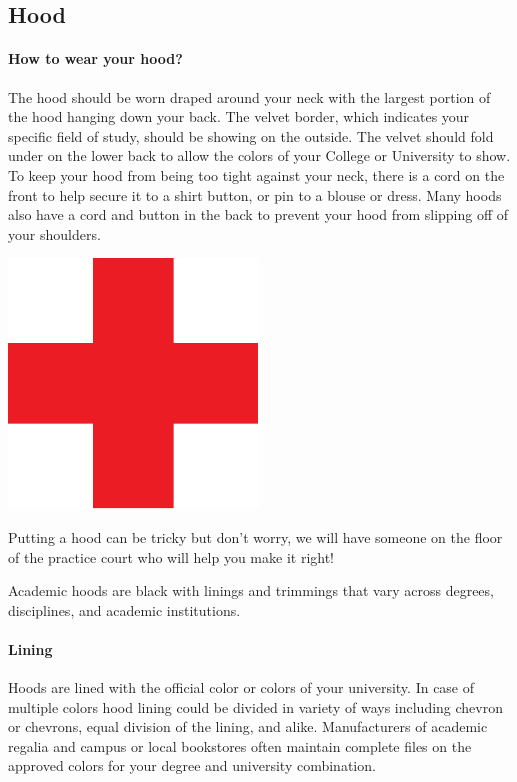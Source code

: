 \documentclass{tufte-handout}
\begin{document}
\subsection{Hood}
\paragraph{How to wear your hood?}The hood should be worn draped around your neck with the largest portion of the hood hanging down your back. The velvet border, which indicates your specific field of study, should be showing on the outside. The velvet should fold under on the lower back to allow the colors of your College or University to show. To keep your hood from being too tight against your neck, there is a cord on the front to help secure it to a shirt button, or pin to a blouse or dress. Many hoods also have a cord and button in the back to prevent your hood from slipping off of your shoulders.

\begin{marginfigure}[-12\baselineskip]%
  \includegraphics[width=.5\linewidth]{red-cross}
  \caption{\linespread{1.3}\selectfont{}Putting a hood can be tricky but don't worry, we will have someone on the floor of the practice court who will help you make it right!}
  \label{fig:help}
\end{marginfigure}

Academic hoods are black with linings and trimmings that vary across degrees, disciplines, and academic institutions.
\paragraph{Lining}Hoods are lined with the official color or colors of your university. In case of multiple colors hood lining could be divided in variety of ways including chevron or chevrons, equal division of the lining, and alike. Manufacturers of academic regalia and campus or local bookstores often maintain complete files on the approved colors for your degree and university combination.
\end{document}
